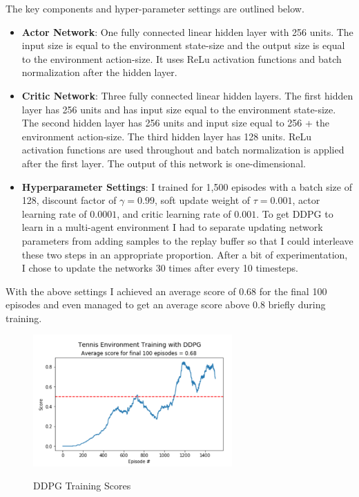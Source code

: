 \documentclass[sigchi]{acmart}
\begin{document}
The key components and hyper-parameter settings are outlined below.
\begin{itemize}
	\item \textbf{Actor Network}: One fully connected linear hidden layer with 256 units. The input size is equal to the environment state-size and the output size is equal to the environment action-size. It uses ReLu activation functions and batch normalization after the hidden layer.
	\item \textbf{Critic Network}: Three fully connected linear hidden layers. The first hidden layer has 256 units and has input size equal to the environment state-size. The second hidden layer has 256 units and input size equal to 256 + the environment action-size. The third hidden layer has 128 units. ReLu activation functions are used throughout  and batch normalization is applied after the first layer. The output of this network is one-dimensional.
	\item \textbf{Hyperparameter Settings}: 
	I trained for 1,500 episodes with a batch size of 128, discount factor of $\gamma = 0.99$, soft update weight of $\tau = 0.001$, actor learning rate of $0.0001$, 
	 and critic learning rate of $0.001$.  To get DDPG to learn in a multi-agent environment I had to separate updating network parameters from adding samples to the replay buffer so that I could interleave these two steps in an appropriate proportion. After a bit of experimentation, I chose to update the networks 30 times after every 10 timesteps. 
\end{itemize}

With the above settings I achieved an average score of 0.68 for the final 100 episodes and even managed to get an average score above 0.8 briefly during training.

\begin{figure}[h]
	\centering
	\includegraphics[width=3.0in]{ddpg-scores}
	\label{fig:ddpg-scores}
	\caption{DDPG Training Scores}
\end{figure}
\end{document}
